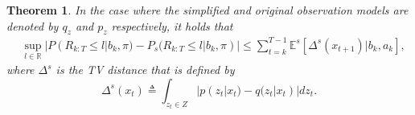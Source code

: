 \documentclass[acmlarge, manuscript, screen, review, natbib=false, oneside]{acmart}
\newtheorem{theorem}{Theorem}[section]
\begin{document}
\begin{theorem}\label{prf:observation_model_simplification_bounds}
	In the case where the simplified and original observation models are denoted by $q_z$ and $p_z$ respectively, it holds that
	\begin{equation}
		\begin{aligned}
			&\sup_{l\in \mathbb{R}}|P(R_{k:T} \leq l|b_k,\pi) \! -\! P_s(R_{k:T} \leq l|b_k,\pi)| \! 
			\leq \!\! \! \sum_{t=k}^{T-1} \mathbb{E}^s[\Delta^s(x_{t+1})|b_k, a_k],
		\end{aligned}
	\end{equation}
	where $\Delta^s$ is the TV distance that is defined by
	\begin{equation}\label{eq:TVdistState_appendix}
		\Delta^s(x_{t}) \triangleq \int_{z_{t}\in Z} |p(z_{t}|x_t)-q(z_t|x_t)|dz_t.
	\end{equation}
\end{theorem}
\end{document}

